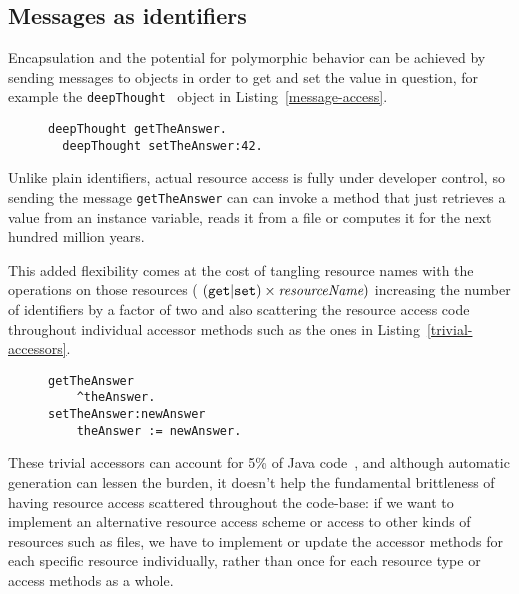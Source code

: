 \documentclass[preprint,authoryear]{llncs}
\begin{document}
\subsection{Messages as identifiers}

Encapsulation and the potential for polymorphic behavior can be achieved by sending 
messages to objects in order to get and set the value in question, for example the
{\tt deepThought}~\cite{adams1997hitchhiker}  object in Listing~\ref{message-access}.

\begin{figure}[htbp]
\begin{lstlisting}[style=L,label=message-access,caption=Retrieve and store value via message sends.]
  deepThought getTheAnswer.
  deepThought setTheAnswer:42.
\end{lstlisting}
\end{figure}

Unlike plain identifiers, actual resource access is fully under developer control, so sending the 
message {\tt getTheAnswer} can can invoke a method that just retrieves a value from an instance
variable, reads it from a file or computes it for the next hundred million years.


This added flexibility comes at the cost of tangling resource names with the operations on those
resources (  $({\tt get}|{\tt set}) \times {\mbox{\em resourceName}} ) $ %
increasing the number of identifiers by a factor of two and also scattering the resource access code
throughout individual accessor methods such as the
ones in Listing~\ref{trivial-accessors}.  

\begin{figure}[htbp]
\begin{lstlisting}[style=L,label=trivial-accessors,caption=Trivial accessors.]
getTheAnswer
    ^theAnswer.
setTheAnswer:newAnswer
    theAnswer := newAnswer.
\end{lstlisting}
\end{figure}

These trivial accessors can account for 5\% of Java code~\cite{Spinellis:2002:MPC:510857.510868}, and although 
 automatic generation can lessen the burden, it doesn't help the fundamental brittleness of 
having resource access scattered throughout the code-base: if we want to implement an alternative resource access scheme or 
access to other kinds of resources such as files, we  have to implement or update the accessor methods for each specific resource individually,
rather than once for each resource type or access methods as a whole.
\end{document}
